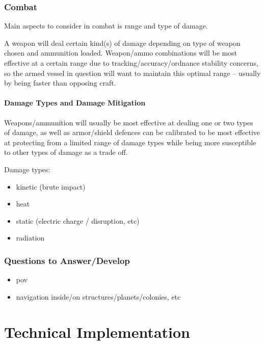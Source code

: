 \documentclass[a4paper,10pt]{article}
\begin{document}
\section{Combat}
\begin{multicols}{2}
Main aspects to consider in combat is range and type of damage.

A weapon will deal certain kind(s) of damage depending on type of weapon chosen
and ammunition loaded. Weapon/ammo combinations will be most effective at a
certain range due to tracking/accuracy/ordnance stability concerns, so the armed
vessel in question will want to maintain this optimal range -- usually by being
faster than opposing craft.

\subsection{Damage Types and Damage Mitigation}
Weapons/ammunition will usually be most effective at dealing one or two types
of damage, as well as armor/shield defences can be calibrated to be most
effective at protecting from a limited range of damage types while being more
susceptible to other types of damage as a trade off.
\end{multicols}

Damage types:
\begin{itemize}
    \item kinetic (brute impact)
    \item heat
    \item static (electric charge / disruption, etc)
    \item radiation
\end{itemize}


\section{Questions to Answer/Develop}
\begin{itemize}
    \item pov
    \item navigation inside/on structures/planets/colonies, etc
\end{itemize}

\part{Technical Implementation}
\end{document}
